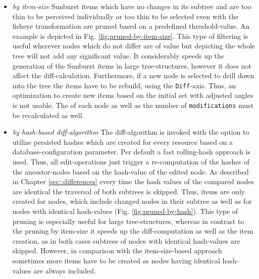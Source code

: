 
\begin{itemize}
\item \emph{by item-size} Sunburst items which have no changes in its subtree and are too thin to be perceived individually or too thin to be selected even with the fisheye transformation are pruned based on a predefined threshold-value. An example is depicted in Fig. \ref{fig:pruned-by-item-size}. This type of filtering is useful wherever nodes which do not differ are of value but depicting the whole tree will not add any significant value. It considerably speeds up the generation of the Sunburst items in large tree-structures, however it does not affect the diff-calculation. Furthermore, if a new node is selected to drill down into the tree the items have to be rebuild, using the \texttt{Diff}-axis. Thus, an optimization to create new items based on the initial set with adjusted angles is not usable. The  of each node as well as the number of \texttt{modifications} must be recalculated as well. 


\item \emph{by hash-based diff-algorithm} The diff-algorithm is invoked with the option to utilize persisted hashes which are created for every resource based on a database-configuration parameter. Per default a fast rolling-hash approach is used. Thus, all edit-operations just trigger a re-computation of the hashes of the ancestor-nodes based on the hash-value of the edited node. As described in Chapter \ref{sec::differences} every time the hash values of the compared nodes are identical the traversal of both subtrees is skipped. Thus, items are only created for nodes, which include changed nodes in their subtree as well as for nodes with identical hash-values (Fig. \ref{fig:pruned-by-hash}). This type of pruning is especially useful for large tree-structures, whereas in contrast to the pruning by item-size it speeds up the diff-computation as well as the item creation, as in both cases subtrees of nodes with identical hash-values are skipped. However, in comparison with the item-size-based approach sometimes more items have to be created as nodes having identical hash-values are always included.


\end{itemize}
